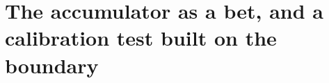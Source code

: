 %
%

\section{The accumulator as a bet, and a calibration test built on the boundary}
\label{sec:evalue}

